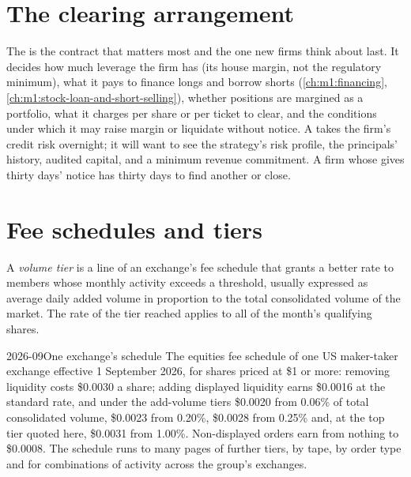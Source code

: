 \section{The clearing arrangement}

The  is the contract that matters most and the one new firms
think about last. It decides how much leverage the firm has (its house
margin, not the regulatory minimum), what it pays to finance longs and
borrow shorts (\cref{ch:m1:financing}, \cref{ch:m1:stock-loan-and-short-selling}),
whether positions are margined as a portfolio, what it charges per share or
per ticket to clear, and the conditions under which it may raise margin or
liquidate without notice. A  takes the firm's credit risk
overnight; it will want to see the strategy's risk profile, the principals'
history, audited capital, and a minimum revenue commitment. A firm whose
 gives thirty days' notice has thirty days to find another or
close.

\section{Fee schedules and tiers}

\begin{definition}\label{def:m1:getting-access-equities:tier}
A \emph{volume tier} is a line of an exchange's fee
schedule that grants a better rate to members whose monthly activity exceeds
a threshold, usually expressed as average daily added volume in proportion to
the total consolidated volume of the market. The rate of the tier reached
applies to all of the month's qualifying shares.
\end{definition}

\begin{dated}{2026-09}{One exchange's schedule}\label{dat:m1:getting-access-equities:bzx}
The equities fee schedule of one US maker-taker exchange effective 1
September 2026, for shares priced at \$1 or more: removing liquidity costs
\$0.0030 a share; adding displayed liquidity earns \$0.0016 at the standard
rate, and under the add-volume tiers \$0.0020 from 0.06\% of total
consolidated volume, \$0.0023 from 0.20\%, \$0.0028 from 0.25\% and, at the top
tier quoted here, \$0.0031 from 1.00\%. Non-displayed orders earn from nothing
to \$0.0008. The schedule runs to many pages of further tiers, by tape, by
order type and for combinations of activity across the group's exchanges.
\end{dated}

